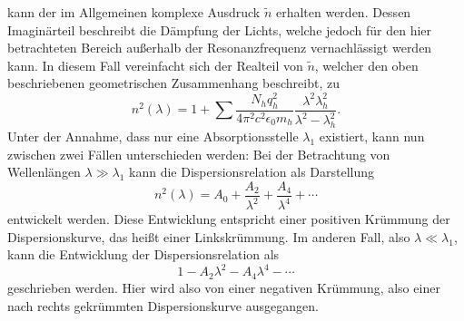 kann der im Allgemeinen komplexe Ausdruck $\tilde{n}$ erhalten werden.
Dessen Imaginärteil beschreibt die Dämpfung der Lichts, welche jedoch für den hier betrachteten Bereich außerhalb der Resonanzfrequenz vernachlässigt werden kann.
In diesem Fall vereinfacht sich der Realteil von $\tilde{n}$, welcher den oben beschriebenen geometrischen Zusammenhang beschreibt, zu
\begin{equation}
  n^2(\lambda) = 1 + \sum \frac{N_h q_h^2}{4 \pi^2 c^2 \epsilon_0 m_h} \frac{\lambda^2 \lambda_h^2}{\lambda^2 - \lambda_h^2}.
\end{equation}
Unter der Annahme, dass nur eine Absorptionsstelle $\lambda_1$ existiert, kann nun zwischen zwei Fällen unterschieden werden:
Bei der Betrachtung von Wellenlängen $\lambda \gg \lambda_1$ kann die Dispersionsrelation als Darstellung
\begin{equation}
  n^2(\lambda) = A_0 + \frac{A_2}{\lambda^2} + \frac{A_4}{\lambda^4} + \dotsb
\end{equation}
entwickelt werden.
Diese Entwicklung entspricht einer positiven Krümmung der Dispersionskurve, das heißt einer Linkskrümmung.
Im anderen Fall, also $\lambda \ll \lambda_1$, kann die Entwicklung der Dispersionsrelation als
\begin{equation}
  1 - A_2 \lambda^2 - A_4 \lambda^4 - \dotsb
\end{equation}
geschrieben werden.
Hier wird also von einer negativen Krümmung, also einer nach rechts gekrümmten Dispersionskurve ausgegangen.
